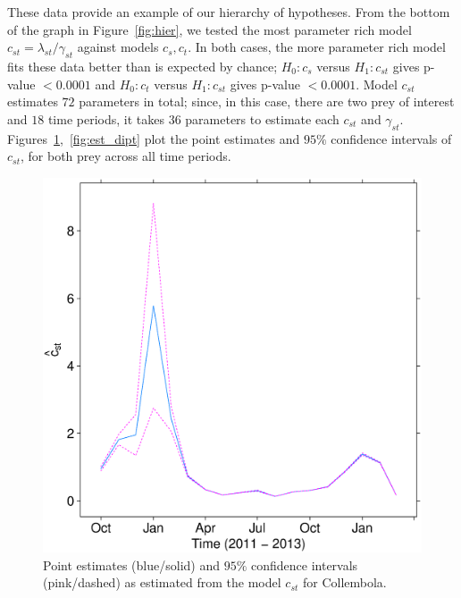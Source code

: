 \documentclass[12pt]{article}
\begin{document}
These data provide an example of our hierarchy of hypotheses.  From the bottom of the graph in Figure~\ref{fig:hier}, we tested the most parameter rich model $c_{st} = \lambda_{st}/\gamma_{st}$ against models $c_{s}, c_{t}$.  In both cases, the more parameter rich model fits these data better than is expected by chance; $H_0: c_s$ versus $H_1: c_{st}$ gives p-value $< 0.0001$ and $H_0: c_t$ versus $H_1: c_{st}$ gives p-value $< 0.0001$.  Model $c_{st}$ estimates $72$ parameters in total; since, in this case, there are two prey of interest and $18$ time periods, it takes $36$ parameters to estimate each $c_{st}$ and $\gamma_{st}$.  Figures~\ref{fig:est_coll},~\ref{fig:est_dipt} plot the point estimates and $95\%$ confidence intervals of $c_{st}$, for both prey across all time periods.  

\begin{figure}
  \centering
  \includegraphics[scale=0.35]{est_coll}
  \caption{Point estimates (blue/solid) and $95\%$ confidence intervals (pink/dashed) as estimated from the model $c_{st}$ for Collembola.}
  \label{fig:est_coll}
\end{figure}
\end{document}
